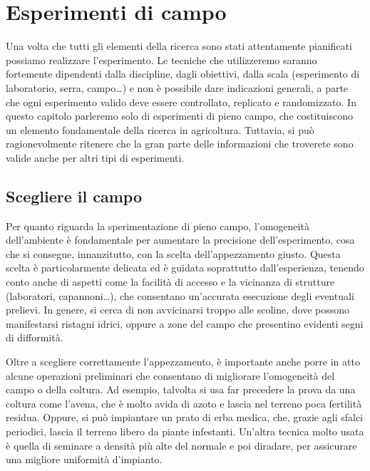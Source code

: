 \documentclass[
  12pt,
]{book}
\begin{document}
\hypertarget{esperimenti-di-campo}{%
\section{Esperimenti di campo}\label{esperimenti-di-campo}}

Una volta che tutti gli elementi della ricerca sono stati attentamente pianificati possiamo realizzare l'esperimento. Le tecniche che utilizzeremo saranno fortemente dipendenti dalla discipline, dagli obiettivi, dalla scala (esperimento di laboratorio, serra, campo\ldots) e non è possibile dare indicazioni generali, a parte che ogni esperimento valido deve essere controllato, replicato e randomizzato.
In questo capitolo parleremo solo di esperimenti di pieno campo, che costituiscono un elemento fondamentale della ricerca in agricoltura. Tuttavia, si può ragionevolmente ritenere che la gran parte delle informazioni che troverete sono valide anche per altri tipi di esperimenti.

\hypertarget{scegliere-il-campo}{%
\subsection{Scegliere il campo}\label{scegliere-il-campo}}

Per quanto riguarda la sperimentazione di pieno campo, l'omogeneità dell'ambiente è fondamentale per aumentare la precisione dell'esperimento, cosa che si consegue, innanzitutto, con la scelta dell'appezzamento giusto. Questa scelta è particolarmente delicata ed è guidata soprattutto dall'esperienza, tenendo conto anche di aspetti come la facilità di accesso e la vicinanza di strutture (laboratori, capannoni\ldots), che consentano un'accurata esecuzione degli eventuali prelievi. In genere, si cerca di non avvicinarsi troppo alle scoline, dove possono manifestarsi ristagni idrici, oppure a zone del campo che presentino evidenti segni di difformità.

Oltre a scegliere correttamente l'appezzamento, è importante anche porre in atto alcune operazioni preliminari che consentano di migliorare l'omogeneità del campo o della coltura. Ad esempio, talvolta si usa far precedere la prova da una coltura come l'avena, che è molto avida di azoto e lascia nel terreno poca fertilità residua. Oppure, si può impiantare un prato di erba medica, che, grazie agli sfalci periodici, lascia il terreno libero da piante infestanti. Un'altra tecnica molto usata è quella di seminare a densità più alte del normale e poi diradare, per assicurare una migliore uniformità d'impianto.
\end{document}
